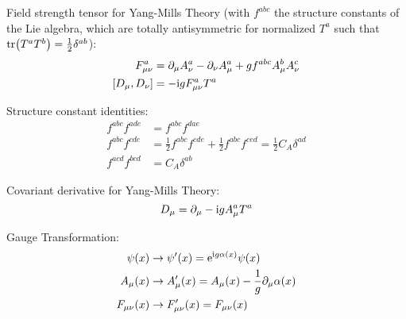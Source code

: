 		\noindent
		Field strength tensor for Yang-Mills Theory (with $f^{abc}$ the structure constants of the Lie algebra, which are totally antisymmetric for normalized $T^a$ such that $\tr(T^a T^b) = \frac{1}{2} \delta^{ab}$):
		\begin{equation}
			\begin{aligned}
				F^a_{\mu\nu} &= \partial_\mu A^a_\nu - \partial_\nu A^a_\mu + g f^{abc} A^b_\mu A^c_\nu \\
				\comm{D_\mu}{D_\nu} &= -\i g F_{\mu\nu}^a T^a				
			\end{aligned}
		\end{equation}

		\noindent
		Structure constant identities:
		\begin{equation}
			\begin{aligned}
				f^{abc} f^{ade} &= f^{abc} f^{dae} \\
				f^{abc} f^{cde} &= \frac{1}{2} f^{abc} f^{cde} + \frac{1}{2} f^{abc} f^{ced} = \frac{1}{2} C_A \delta^{ad} \\
				f^{acd} f^{bcd} &= C_A \delta^{ab}
			\end{aligned}
		\end{equation}

		\noindent
		Covariant derivative for Yang-Mills Theory:
		\begin{equation}
			D_\mu = \partial_\mu - \mathrm{i} g A_\mu^a T^a
		\end{equation}

		\noindent
		Gauge Transformation:
		\begin{equation}
			\begin{aligned}
				\psi(x) &\rightarrow \psi'(x) = \mathrm{e}^{\mathrm{i} g \alpha(x)} \psi(x) \\
				A_\mu(x) &\rightarrow A'_\mu(x) = A_\mu(x) - \frac{1}{g} \partial_\mu \alpha(x) \\
				F_{\mu\nu}(x) &\rightarrow F'_{\mu\nu}(x) = F_{\mu\nu}(x) 
			\end{aligned}
		\end{equation}

